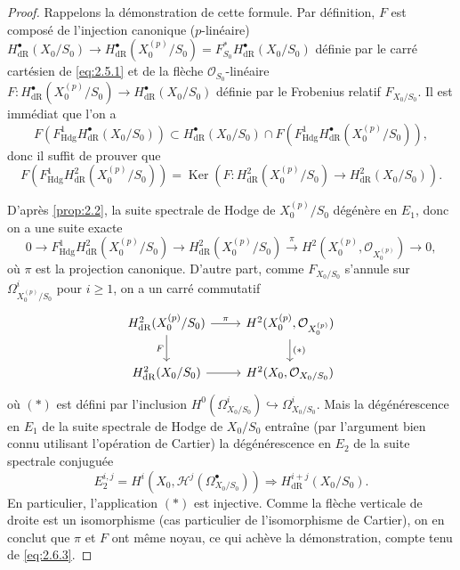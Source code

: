 \documentclass[12pt,a4paper]{article}
\theoremstyle{plain}
\theoremstyle{definition}
\theoremstyle{remark}
\DeclareMathOperator{\Ker}{Ker}
\newcommand{\Hdg}{\mathrm{Hdg}}
\begin{document}
\begin{proof}
Rappelons la démonstration de cette formule. Par définition, $F$ est composé de l'injection canonique ($p$-linéaire) $H^{\bullet}_{\mathrm{dR}}(X_0/S_0) \to H^{\bullet}_{\mathrm{dR}}(X_0^{(p)}/S_0) = F_{S_0}^* H^{\bullet}_{\mathrm{dR}}(X_0/S_0)$ définie par le carré cartésien de \eqref{eq:2.5.1} et de la flèche $\mathcal{O}_{S_0}$-linéaire $F: H^{\bullet}_{\mathrm{dR}}(X_0^{(p)}/S_0) \to H^{\bullet}_{\mathrm{dR}}(X_0/S_0)$ définie par le Frobenius relatif $F_{X_0/S_0}$. Il est immédiat que l'on a
\[
F(F^1_{\Hdg} H^{\bullet}_{\mathrm{dR}}(X_0/S_0)) \subset H^{\bullet}_{\mathrm{dR}}(X_0/S_0) \cap F(F^1_{\Hdg} H^{\bullet}_{\mathrm{dR}}(X_0^{(p)}/S_0)),
\]
donc il suffit de prouver que
\begin{equation}\label{eq:2.6.2}
F(F^1_{\Hdg} H^2_{\mathrm{dR}}(X_0^{(p)}/S_0)) = \Ker(F: H^2_{\mathrm{dR}}(X_0^{(p)}/S_0) \to H^2_{\mathrm{dR}}(X_0/S_0)).
\end{equation}

D'après \ref{prop:2.2}, la suite spectrale de Hodge de $X_0^{(p)}/S_0$ dégénère en $E_1$, donc on a une suite exacte
\begin{equation}\label{eq:2.6.3}
0 \to F^1_{\Hdg} H^2_{\mathrm{dR}}(X_0^{(p)}/S_0) \to H^2_{\mathrm{dR}}(X_0^{(p)}/S_0) \xrightarrow{\pi} H^2(X_0^{(p)}, \mathcal{O}_{X_0^{(p)}}) \to 0,
\end{equation}
où $\pi$ est la projection canonique. D'autre part, comme $F_{X_0/S_0}$ s'annule sur $\Omega^i_{X_0^{(p)}/S_0}$ pour $i \geqslant 1$, on a un carré commutatif
\[
\begin{tikzcd}
H^2_{\mathrm{dR}}(X_0^{(p)}/S_0) \arrow[r, "\pi"] \arrow[d, "F"'] & H^2(X_0^{(p)}, \mathcal{O}_{X_0^{(p)}}) \arrow[d, "(*)"] \\
H^2_{\mathrm{dR}}(X_0/S_0) \arrow[r] & H^2(X_0, \mathcal{O}_{X_0/S_0})
\end{tikzcd}
\]
où $(*)$ est défini par l'inclusion $H^0(\Omega^i_{X_0/S_0}) \hookrightarrow \Omega^i_{X_0/S_0}$. Mais la dégénérescence en $E_1$ de la suite spectrale de Hodge de $X_0/S_0$ entraîne (par l'argument bien connu utilisant l'opération de Cartier) la dégénérescence en $E_2$ de la suite spectrale conjuguée
\[
E_2^{i,j} = H^i(X_0, \mathcal{H}^j(\Omega^{\bullet}_{X_0/S_0})) \Rightarrow H^{i+j}_{\mathrm{dR}}(X_0/S_0).
\]
En particulier, l'application $(*)$ est injective. Comme la flèche verticale de droite est un isomorphisme (cas particulier de l'isomorphisme de Cartier), on en conclut que $\pi$ et $F$ ont même noyau, ce qui achève la démonstration, compte tenu de \eqref{eq:2.6.3}.
\end{proof}
\end{document}
